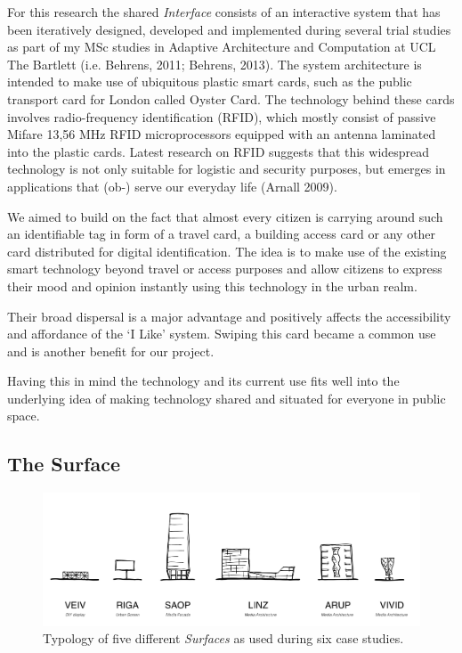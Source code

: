 For this research the shared \textit{Interface} consists of an interactive system that has been iteratively designed, developed and implemented during several trial studies as part of my MSc studies in Adaptive Architecture and Computation at UCL The Bartlett (i.e. Behrens, 2011; Behrens, 2013). 
The system architecture is intended to make use of ubiquitous plastic smart cards, such as the public transport card for  London called Oyster Card. The technology behind these cards involves radio-frequency identification (RFID), which mostly consist of passive Mifare 13,56 MHz RFID microprocessors equipped with an antenna laminated into the plastic cards.
Latest research on RFID suggests that this widespread technology is not only suitable for logistic and security purposes, but emerges in applications that (ob-) serve our everyday life (Arnall 2009).

We aimed to build on the fact that almost every citizen is carrying around such an identifiable tag in form of a travel card, a building access card or any other card distributed for digital identification.
The idea is to make use of the existing smart technology beyond travel or access purposes and allow citizens to express their mood and opinion instantly using this technology in the urban realm. 

Their broad dispersal is a major advantage and positively affects the accessibility and affordance of the ‘I Like’ system. 
Swiping this card became a common use and is another benefit for our project.

Having this in mind the technology and its current use fits well into the underlying idea of making technology shared and situated for everyone in public space. 


\subsection{The Surface}

\begin{figure}[!h] 
\centering
\includegraphics[width=\textwidth]{Illustrations/Surfaces.png}
\caption [Typology of architectural surfaces] {Typology of five different \textit{Surfaces} as used during six case studies.}
\label{surfaces}
\end{figure}


